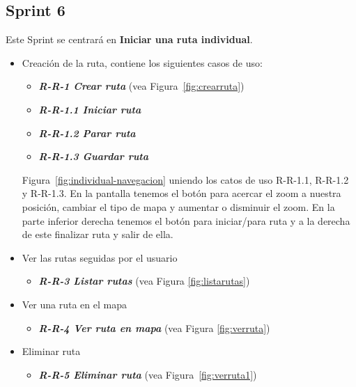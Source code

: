 \subsection{Sprint 6}
Este Sprint se centrará en \textbf{Iniciar una ruta individual}.

\begin{itemize}
\item Creación de la ruta, contiene los siguientes casos de uso:

\begin{itemize}
\item \textbf{\textit{R-R-1 Crear ruta}} (vea Figura~\ref{fig:crearruta})
\item \textbf{\textit{R-R-1.1 Iniciar ruta}}
\item\textbf{ \textit{R-R-1.2 Parar ruta}}
\item \textbf{\textit{R-R-1.3 Guardar ruta}} 
\end{itemize}
Figura~\ref{fig:individual-navegacion} uniendo los catos de uso R-R-1.1, R-R-1.2 y R-R-1.3. En la pantalla tenemos el botón para acercar el zoom a nuestra posición, cambiar el tipo de mapa y aumentar o disminuir el zoom. En la parte inferior derecha tenemos el botón para iniciar/para ruta y a la derecha de este finalizar ruta y salir de ella.
\item Ver las rutas seguidas por el usuario

\begin{itemize}
\item \textbf{\textit{R-R-3 Listar rutas} } (vea Figura \ref{fig:listarutas})

\end{itemize}
\item Ver una ruta en el mapa 

\begin{itemize}
\item \textbf{\textit{R-R-4 Ver ruta en mapa}}  (vea Figura \ref{fig:verruta})

\end{itemize}
\item Eliminar ruta

\begin{itemize}
\item \textbf{\textit{R-R-5 Eliminar ruta}} (vea Figura~\ref{fig:verruta1})

\end{itemize}

\end{itemize}








